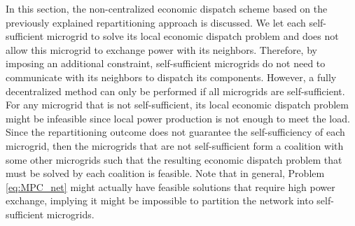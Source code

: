 In this section, the non-centralized economic dispatch scheme based on the previously explained repartitioning approach is discussed. %
We let each self-sufficient microgrid to solve its local economic dispatch problem and does not allow this microgrid to exchange power with its neighbors. Therefore, by imposing an additional constraint, self-sufficient microgrids do not need to communicate with its neighbors to dispatch its components. However, a fully decentralized method can only be performed if all microgrids are self-sufficient. For any microgrid that is not self-sufficient, its local economic dispatch problem might be infeasible since local power production is not enough to meet the load.  Since the repartitioning outcome does not guarantee the self-sufficiency of each microgrid, then the microgrids that are not self-sufficient form a coalition with some other microgrids such that the resulting economic dispatch problem that must be solved by each coalition is feasible. Note that in general, Problem \eqref{eq:MPC_net} might actually have feasible solutions that require high power exchange, implying it might be impossible to partition the network into self-sufficient microgrids.

